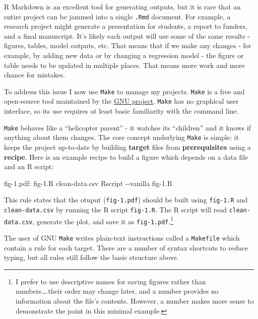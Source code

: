 \documentclass[
  letterpaper,
  openany]{book}
\newenvironment{Shaded}{\begin{snugshade}}{\end{snugshade}}
\newcommand{\DataTypeTok}[1]{\textcolor[rgb]{0.13,0.29,0.53}{#1}}
\newcommand{\DecValTok}[1]{\textcolor[rgb]{0.00,0.00,0.81}{#1}}
\newcommand{\NormalTok}[1]{#1}
\begin{document}
R Markdown is an excellent tool for generating outputs, but it is rare that an entire project can be jammed into a single \texttt{.Rmd} document.
For example, a research project might generate a presentation for students, a report to funders, and a final manuscript.
It's likely each output will use some of the same results - figures, tables, model outputs, etc. That means that if we make any changes - for example, by adding new data or by changing a regression model - the figure or table needs to be updated in multiple places.
That means more work and more chance for mistakes.

To address this issue I now use \texttt{Make} to manage my projects.
\texttt{Make} is a free and open-source tool maintained by the \href{https://www.gnu.org/software/}{GNU project}.
\texttt{Make} has no graphical user interface, so its use requires at least basic familiarity with the command line.

\texttt{Make} behaves like a ``helicopter parent'' - it watches its ``children'' and it knows if anything about them changes.
The core concept underlying \texttt{Make} is simple: it keeps the project up-to-date by building \textbf{target} files from \textbf{prerequisites} using a \textbf{recipe}.
Here is an example recipe to build a figure which depends on a data file and an R script:

\begin{Shaded}
\begin{Highlighting}[]
\DecValTok{fig{-}1.pdf:}\DataTypeTok{  fig{-}1.R  clean{-}data.csv}
\NormalTok{    Rscript {-}{-}vanilla fig{-}1.R}
\end{Highlighting}
\end{Shaded}

This rule states that the otuput (\texttt{fig-1.pdf}) should be built using \texttt{fig-1.R} and \texttt{clean-data.csv} by running the R script \texttt{fig-1.R}.
The R script will read \texttt{clean-data.csv}, generate the plot, and save it as \texttt{fig-1.pdf}.\footnote{I prefer to use descriptive names for saving figures rather than numbers\ldots.their order may change later, and a number provides no information about the file's contents. However, a number makes more sense to demonstrate the point in this minimal example.}

The user of GNU \texttt{Make} writes plain-text instructions called a \texttt{Makefile} which contain a rule for each target.
There are a number of syntax shortcuts to reduce typing, but all rules still follow the basic structure above.
\end{document}
